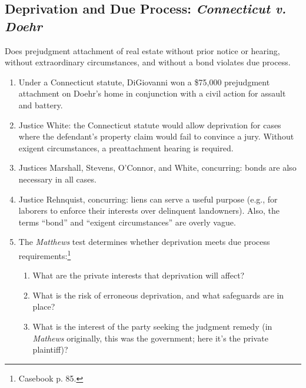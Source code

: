 \subsection{Deprivation and Due Process: \emph{Connecticut v. Doehr}}

Does prejudgment attachment of real estate without prior notice 
or hearing, without extraordinary circumstances, and without a 
bond violates due process.

\begin{enumerate}
    \item  Under a Connecticut statute, DiGiovanni won a \$75,000 prejudgment 
    attachment on Doehr’s home in conjunction with a civil action for assault 
    and battery.
    \item Justice White: the Connecticut statute would allow deprivation for 
    cases where the defendant's property claim would fail to convince a jury. 
    Without exigent circumstances, a preattachment hearing is required.
    \item Justices Marshall, Stevens, O'Connor, and White, concurring: bonds 
    are also necessary in all cases.
    \item Justice Rehnquist, concurring: liens can serve a useful purpose 
    (e.g., for laborers to enforce their interests over delinquent 
    landowners). Also, the terms ``bond'' and ``exigent circumstances'' are 
    overly vague.
    \item The \emph{Matthews} test determines whether deprivation meets due 
    process requirements:\footnote{Casebook p. 85.}
    \begin{enumerate}
        \item What are the private interests that deprivation will affect?
        \item What is the risk of erroneous deprivation, and what safeguards 
        are in place?
        \item What is the interest of the party seeking the judgment remedy 
        (in \emph{Mathews} originally, this was the government; here it's the 
        private plaintiff)?
    \end{enumerate}
\end{enumerate}
